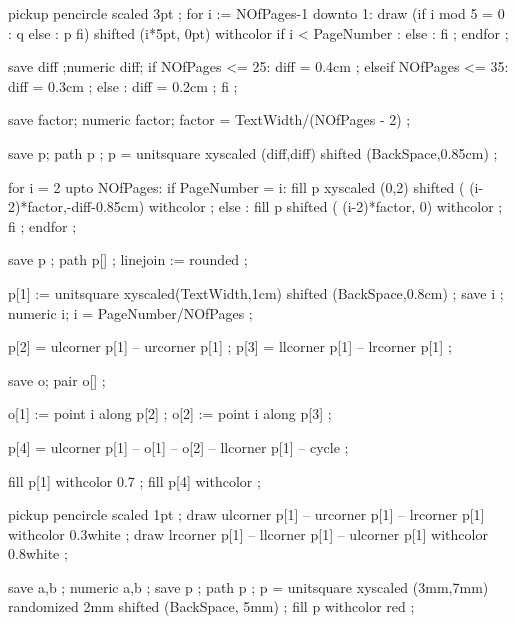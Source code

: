 pickup pencircle scaled 3pt ;
for i := NOfPages-1 downto 1:
  draw (if i mod 5 = 0 : q else : p fi)
       shifted (i*5pt, 0pt)
       withcolor if i < PageNumber :  
                 else :              
                 fi ;
endfor ;
\stopuseMPgraphic

save diff ;numeric diff; 
if NOfPages <= 25:
	diff = 0.4cm ;
elseif NOfPages <= 35:
	diff = 0.3cm ;
else :
	diff = 0.2cm ;
fi ;

save factor; numeric factor; 
factor = TextWidth/(NOfPages - 2) ;

save p; path p ;
p = unitsquare xyscaled (diff,diff) 
               shifted (BackSpace,0.85cm) ;

for i = 2 upto NOfPages:
  if PageNumber = i:
    fill p xyscaled (0,2) shifted ( (i-2)*factor,-diff-0.85cm) 
         withcolor  ;
  else :
    fill p shifted ( (i-2)*factor, 0) 
         withcolor  ;
  fi ;
endfor ;
\stopuseMPgraphic 

save p ;
path p[] ;
linejoin := rounded ;

p[1] := unitsquare xyscaled(TextWidth,1cm) shifted (BackSpace,0.8cm) ;
save i ;
numeric i; 
i = PageNumber/NOfPages ;

p[2] = ulcorner p[1] -- urcorner p[1] ;
p[3] = llcorner p[1] -- lrcorner p[1] ;

save o;
pair o[] ;

o[1] := point i along p[2] ;
o[2] := point i along p[3] ;

p[4] = ulcorner p[1] -- o[1] -- o[2] -- llcorner p[1] -- cycle ;

fill p[1] withcolor 0.7 ;
fill p[4] withcolor  ;

pickup pencircle scaled 1pt ;
draw ulcorner p[1] -- urcorner p[1] -- lrcorner p[1] withcolor 0.3white ;
draw lrcorner p[1] -- llcorner p[1] -- ulcorner p[1] withcolor 0.8white ;


% 
% 
% 
% 
% 
\stopuseMPgraphic

save a,b ;
numeric a,b ;
save p ;
path p ;
p = unitsquare xyscaled (3mm,7mm) randomized 2mm shifted (BackSpace, 5mm) ;
fill p withcolor red ;
% 
% 
\stopuseMPgraphic


\protect

\stopmodule
